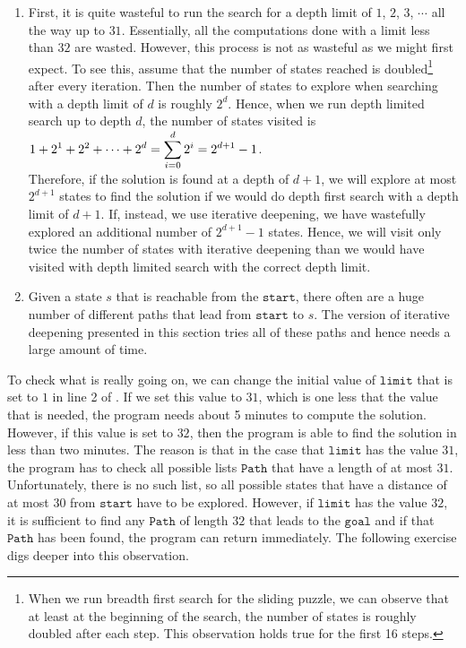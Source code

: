 \begin{enumerate}
\item First, it is quite wasteful to run the search for a depth limit of $1$, $2$, $3$, $\cdots$ all the way up
      to $31$.  Essentially, all the computations done with a limit less than $32$ are wasted. However,
      this process is not as wasteful as we might first expect.  To see this, assume that the number of states
      reached is doubled\footnote{
        When we run breadth first search for the sliding puzzle, we can observe that at least at the beginning
        of the search, the number of states is roughly doubled after each step.  This observation holds true for
        the first 16 steps. 
      }
      after every iteration.  Then the number of states to explore when searching with a depth limit of $d$ is 
      roughly $2^d$.  Hence, when we run depth limited search up to depth $d$, the number of states visited is 
      \\[0.2cm]
      \hspace*{1.3cm}
      $\displaystyle 1 + 2^1 + 2^2 + \cdots + 2^d = \sum\limits_{i=0}^d 2^i = 2^{d+1} - 1$.
      \\[0.2cm]
      Therefore, if the solution is found at a depth of $d+1$, we will explore at most $2^{d+1}$ states to find
      the solution if we would do depth first search with a depth limit of $d+1$.  If, instead, we use
      iterative deepening, we have wastefully explored an additional number of $2^{d+1} -1$ states.  Hence, we
      will visit only twice the number of states with iterative deepening than we would have visited with depth
      limited search with the correct depth limit.
\item Given a state $s$ that is reachable from the $\texttt{start}$, there often are a huge number of
      different paths that lead from $\texttt{start}$ to $s$.  The version of iterative deepening presented in
      this section tries all of these paths and hence needs a large amount of time.
\end{enumerate}
To check what is really going on, we can change the initial value of $\texttt{limit}$ that is set to $1$ in
line 2 of .  If we set this value to $31$, which is one less that the
value that is needed, the program needs about 5 minutes to compute the solution.  However, if this value is set to
$32$, then the program is able to find the solution in less than two minutes.  The reason is that in the case that 
$\texttt{limit}$ has the value $31$, the program has to check all possible lists $\texttt{Path}$ that have a
length of at most $31$.  Unfortunately, there is no such list, so all possible states that have a distance of
at most $30$ from $\texttt{start}$ have to be explored. However, if $\texttt{limit}$ has the value $32$, it is sufficient to find any
$\texttt{Path}$ of length $32$ that leads to the $\texttt{goal}$ and if that $\texttt{Path}$ has been found, the
program can return immediately.  The following exercise digs deeper into this observation.

